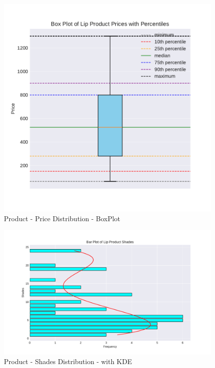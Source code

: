 \documentclass{article}
\begin{document}
\begin{center}
    \begin{figure}[htbp]
        \centering
        \includegraphics[scale=0.6]{../images/India-graphs/Box_Prices.pdf}
        \caption{Product - Price Distribution - BoxPlot}
        \label{Box_Prices_ind}
    \end{figure}

    \begin{figure}[htbp]
        \centering
        \includegraphics[scale=0.6]{../images/Indonesia-graphs/KDE_Shades.pdf}
        \caption{Product - Shades Distribution - with KDE}
        \label{KDE_Shades_ind}
    \end{figure}
    \restoregeometry

\end{center}
\restoregeometry
\end{document}
